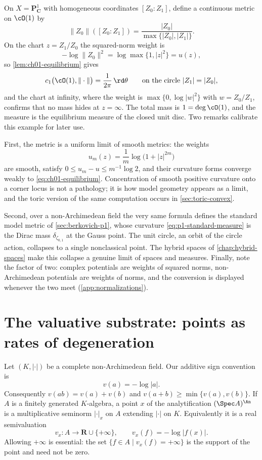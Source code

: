 \begin{example}
\label{ex:ch01-equilibrium-metric}
On $X=\mathbf P^1_{\mathbf C}$ with homogeneous coordinates $[Z_0:Z_1]$,
define a continuous metric on $\cO(1)$ by
\[
   \|Z_0\|([Z_0:Z_1])=\frac{|Z_0|}{\max\{|Z_0|,|Z_1|\}}.
\]
On the chart $z=Z_1/Z_0$ the squared-norm weight is
\[
   -\log\|Z_0\|^2=\log\max\{1,|z|^2\}=u(z),
\]
so \cref{lem:ch01-equilibrium} gives
\[
   c_1\bigl(\cO(1),\|\cdot\|\bigr)
   =\frac{1}{2\pi}\,\rd\theta
   \qquad\text{on the circle }|Z_1|=|Z_0|,
\]
and the chart at infinity, where the weight is
$\max\{0,\log|w|^2\}$ with $w=Z_0/Z_1$, confirms that no mass hides at
$z=\infty$.  The total mass is $1=\deg\cO(1)$, and the measure is the
equilibrium measure of the closed unit disc.  Two remarks calibrate this
example for later use.

First, the metric is a uniform limit of smooth metrics: the weights
\[
   u_m(z)=\frac1m\log\bigl(1+|z|^{2m}\bigr)
\]
are smooth, satisfy $0\leq u_m-u\leq m^{-1}\log2$, and their curvature forms
converge weakly to \eqref{eq:ch01-equilibrium}.  Concentration of smooth
positive curvature onto a corner locus is not a pathology; it is how model
geometry appears as a limit, and the toric version of the same computation
occurs in \cref{sec:toric-convex}.

Second, over a non-Archimedean field the very same formula defines the
standard model metric of
\cref{sec:berkovich-p1}, whose curvature \eqref{eq:p1-standard-measure} is
the Dirac mass $\delta_{\zeta_{0,1}}$ at the Gauss point.  The unit circle,
an orbit of the circle action, collapses to a single nonclassical point.
The hybrid spaces of \cref{chap:hybrid-spaces} make this collapse a genuine
limit of spaces and measures.  Finally, note the factor of two: complex
potentials are weights of squared norms, non-Archimedean potentials are
weights of norms, and the conversion is displayed whenever the two meet
(\cref{app:normalizations}).
\end{example}

\section{The valuative substrate: points as rates of degeneration}
\label{sec:ch01-valuative-entrance}

Let $(K,|\cdot|)$ be a complete non-Archimedean field.  Our additive sign
convention is
\[
                        v(a)=-\log|a|.
\]
Consequently $v(ab)=v(a)+v(b)$ and
$v(a+b)\geq\min\{v(a),v(b)\}$.  If $A$ is a finitely generated $K$-algebra,
a point $x$ of the analytification $(\Spec A)^{\An}$ is a multiplicative seminorm
$|\cdot|_x$ on $A$ extending $|\cdot|$ on $K$.  Equivalently it is a real
semivaluation
\[
       v_x:A\longrightarrow\mathbf R\cup\{+\infty\},
       \qquad v_x(f)=-\log|f(x)|.
\]
Allowing $+\infty$ is essential: the set
$\{f\in A\mid v_x(f)=+\infty\}$ is the support of the point and need not be
zero.

